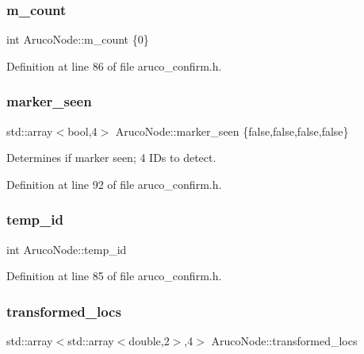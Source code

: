\subsubsection{\texorpdfstring{m\+\_\+count}{m\_count}}
{\footnotesize\ttfamily int Aruco\+Node\+::m\+\_\+count \{0\}}



Definition at line 86 of file aruco\+\_\+confirm.\+h.

\mbox{\label{class_aruco_node_a2e41167c119527f9fbeb937838fc8909}} 
\subsubsection{\texorpdfstring{marker\+\_\+seen}{marker\_seen}}
{\footnotesize\ttfamily std\+::array$<$bool,4$>$ Aruco\+Node\+::marker\+\_\+seen \{false,false,false,false\}}



Determines if marker seen; 4 I\+Ds to detect. 



Definition at line 92 of file aruco\+\_\+confirm.\+h.

\mbox{\label{class_aruco_node_ac9561321e855855ccc8f643cc139a638}} 
\subsubsection{\texorpdfstring{temp\+\_\+id}{temp\_id}}
{\footnotesize\ttfamily int Aruco\+Node\+::temp\+\_\+id}



Definition at line 85 of file aruco\+\_\+confirm.\+h.

\mbox{\label{class_aruco_node_ab410bc0b655071ee67e7ba63b4edf256}} 
\subsubsection{\texorpdfstring{transformed\+\_\+locs}{transformed\_locs}}
{\footnotesize\ttfamily std\+::array$<$std\+::array$<$double,2$>$,4$>$ Aruco\+Node\+::transformed\+\_\+locs}



